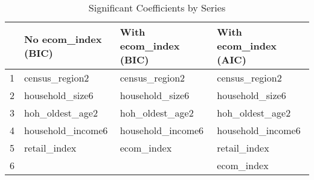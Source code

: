 \begin{table}[ht]
\centering
\caption{Significant Coefficients by Series} 
\label{tab:series_coefs}
\begin{tabular}{rlll}
  \hline
 & No ecom\_index (BIC) & With ecom\_index (BIC) & With ecom\_index (AIC) \\ 
  \hline
1 & census\_region2 & census\_region2 & census\_region2 \\ 
  2 & household\_size6 & household\_size6 & household\_size6 \\ 
  3 & hoh\_oldest\_age2 & hoh\_oldest\_age2 & hoh\_oldest\_age2 \\ 
  4 & household\_income6 & household\_income6 & household\_income6 \\ 
  5 & retail\_index & ecom\_index & retail\_index \\ 
  6 &  &  & ecom\_index \\ 
   \hline
\end{tabular}
\end{table}
